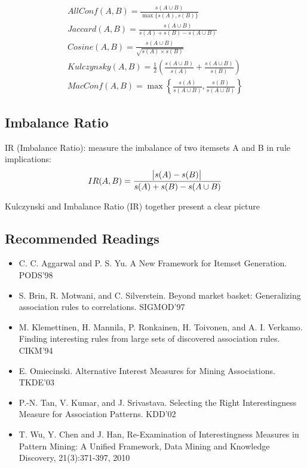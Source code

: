 \begin{gather*}
AllConf(A, B) = \frac{s(A \cup B)}{\max\{s(A), s(B)\}} \\
Jaccard(A, B) = \frac{s(A \cup B)}{s(A) + s(B) - s(A \cup B)} \\
Cosine(A, B) = \frac{s(A \cup B)}{\sqrt{s(A) \times s(B)}} \\
Kulczynsky(A, B) = \frac{1}{2}\left(\frac{s(A \cup B)}{s(A)} + \frac{s(A \cup B)}{s(B)}\right)\\
MacConf(A, B)=\max\left\{\frac{s(A)}{s(A \cup B)}, \frac{s(B)}{s(A \cup B)}\right\}
\end{gather*}

\subsection{Imbalance Ratio}
IR (Imbalance Ratio): measure the imbalance of two itemsets A and B in rule implications:
\begin{equation*}
IR(A, B)=\frac{\abs{s(A)-s(B)}}{s(A) + s(B) - s(A \cup B)}
\end{equation*}

Kulczynski and Imbalance Ratio (IR) together present a clear picture

\subsection{Recommended Readings}
\begin{itemize}
\item C. C. Aggarwal and P. S. Yu. A New Framework for Itemset Generation. PODS’98
\item S. Brin, R. Motwani, and C. Silverstein. Beyond market basket: Generalizing
association rules to correlations. SIGMOD'97
\item M. Klemettinen, H. Mannila, P. Ronkainen, H. Toivonen, and A. I. Verkamo. Finding interesting rules from large sets of discovered association rules. CIKM'94
\item E. Omiecinski. Alternative Interest Measures for Mining Associations. TKDE’03
\item P.-N. Tan, V. Kumar, and J. Srivastava. Selecting the Right Interestingness Measure for
Association Patterns. KDD'02
\item T. Wu, Y. Chen and J. Han, Re-Examination of Interestingness Measures in Pattern Mining: A Unified Framework, Data Mining and Knowledge Discovery, 21(3):371-397, 2010
\end{itemize}
